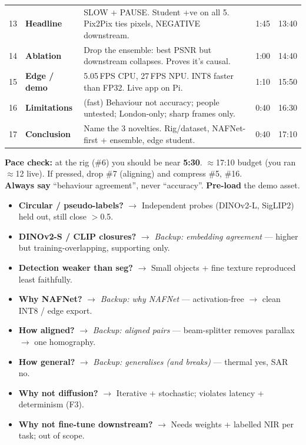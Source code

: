 \documentclass[9pt]{extarticle}
\newcommand{\hd}[1]{\textbf{\textcolor{ICLBlue}{#1}}}
\begin{document}
\begin{tabularx}{\textwidth}{@{}c >{\bfseries}l Y c c@{}}
13 & Headline & \textcolor{Hi}{SLOW + PAUSE.} Student +ve on all 5. Pix2Pix ties pixels, NEGATIVE downstream. & 1:45 & 13:40\\
14 & Ablation & Drop the ensemble: \textcolor{Hi}{best PSNR but downstream collapses.} Proves it's causal. & 1:00 & 14:40\\
15 & Edge / demo & 5.05\,FPS CPU, 27\,FPS NPU. INT8 faster than FP32. Live app on Pi. & 1:10 & 15:50\\
16 & Limitations & \textcolor{Hi}{(fast)} Behaviour not accuracy; people untested; London-only; sharp frames only. & 0:40 & 16:30\\
17 & Conclusion & \textcolor{Hi}{Name the 3 novelties.} Rig/dataset, NAFNet-first + ensemble, edge student. & 0:40 & 17:10\\
\bottomrule
\end{tabularx}

\vspace{4pt}
\noindent\hd{Pace check:} at the rig (\#6) you should be near \textbf{5:30}. $\approx$17:10 budget (you ran $\approx$12 live). If pressed, drop \#7 (aligning) and compress \#5, \#16.\\
\hd{Always say} ``behaviour agreement'', never ``accuracy''. \quad \hd{Pre-load} the demo asset.

\vspace{6pt}
\noindent{\bfseries\textcolor{ICLBlue}{Q\&A — question $\to$ backup slide}}
\begin{itemize}
	\item \textbf{Circular / pseudo-labels?} $\to$ Independent probes (DINOv2-L, SigLIP2) held out, still close $>$0.5.
	\item \textbf{DINOv2-S / CLIP closures?} $\to$ \emph{Backup: embedding agreement} — higher but training-overlapping, supporting only.
	\item \textbf{Detection weaker than seg?} $\to$ Small objects + fine texture reproduced least faithfully.
	\item \textbf{Why NAFNet?} $\to$ \emph{Backup: why NAFNet} — activation-free $\to$ clean INT8 / edge export.
	\item \textbf{How aligned?} $\to$ \emph{Backup: aligned pairs} — beam-splitter removes parallax $\to$ one homography.
	\item \textbf{How general?} $\to$ \emph{Backup: generalises (and breaks)} — thermal yes, SAR no.
	\item \textbf{Why not diffusion?} $\to$ Iterative + stochastic; violates latency + determinism (F3).
	\item \textbf{Why not fine-tune downstream?} $\to$ Needs weights + labelled NIR per task; out of scope.
\end{itemize}
\end{document}
